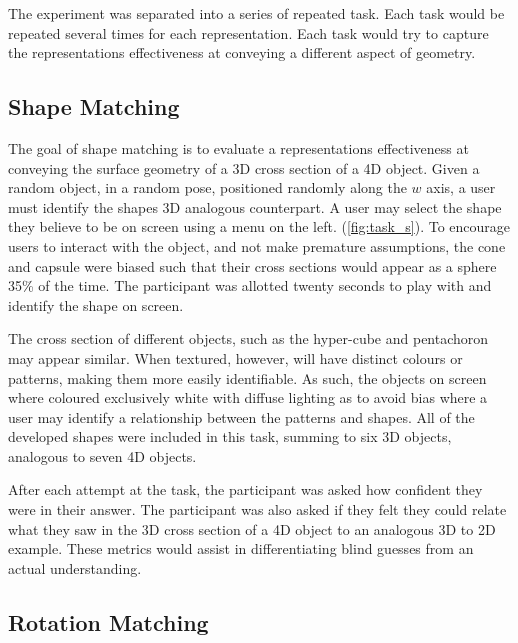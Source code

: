 \documentclass{l4proj}
\begin{document}
The experiment was separated into a series of repeated task. Each task would be repeated several times for each representation. Each task would try to capture the representations effectiveness at conveying a different aspect of geometry.

\subsection{Shape Matching}

The goal of shape matching is to evaluate a representations effectiveness at conveying the surface geometry of a 3D cross section of a 4D object.
Given a random object, in a random pose, positioned randomly along the $w$ axis, a user must identify the shapes 3D analogous counterpart. A user may select the shape they believe to be on screen using a menu on the left.
(\cref{fig:task_s}).
To encourage users to interact with the object, and not make premature assumptions, the cone and capsule were biased such that their cross sections would appear as a sphere 35\% of the time.
The participant was allotted twenty seconds to play with and identify the shape on screen.

The cross section of different objects, such as the hyper-cube and pentachoron may appear similar. When textured, however, will have distinct colours or patterns, making them more easily identifiable. As such, the objects on screen where coloured exclusively white with diffuse lighting as to avoid bias where a user may identify a relationship between the patterns and shapes. 
All of the developed shapes were included in this task, summing to six 3D objects, analogous to seven 4D objects.

After each attempt at the task, the participant was asked how confident they were in their answer. The participant was also asked if they felt they could relate what they saw in the 3D cross section of a 4D object to an analogous 3D to 2D example. These metrics would assist in differentiating blind guesses from an actual understanding.

\subsection{Rotation Matching}
\end{document}
